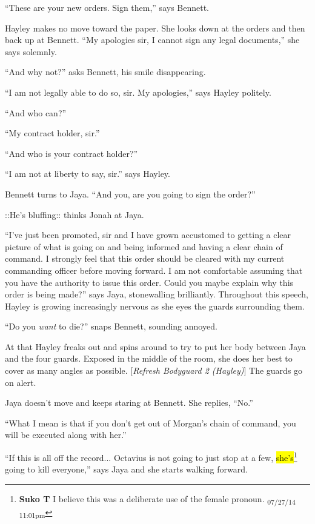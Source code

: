 ``These are your new orders.  Sign them,'' says Bennett.

Hayley makes no move toward the paper.  She looks down at the orders and then back up at Bennett.  ``My apologies sir, I cannot sign any legal documents,'' she says solemnly.

``And why not?'' asks Bennett, his smile disappearing.

``I am not legally able to do so, sir.  My apologies,'' says Hayley politely.

``And who can?''

``My contract holder, sir.''

``And who is your contract holder?''

``I am not at liberty to say, sir.'' says Hayley.

Bennett turns to Jaya.  ``And you, are you going to sign the order?''

 {\color[RGB]{74,134,232}::He's bluffing:: } thinks Jonah at Jaya.

``I've just been promoted, sir and I have grown accustomed to getting a clear picture of what is going on and being informed and having a clear chain of command.  I strongly feel that this order should be cleared with my current commanding officer before moving forward.  I am not comfortable assuming that you have the authority to issue this order.  Could you maybe explain why this order is being made?'' says Jaya, stonewalling brilliantly.  Throughout this speech, Hayley is growing increasingly nervous as she eyes the guards surrounding them.

``Do you \textit{want} to die?'' snaps Bennett, sounding annoyed.

At that Hayley freaks out and spins around to try to put her body between Jaya and the four guards.  Exposed in the middle of the room, she does her best to cover as many angles as possible. {[}\textit{Refresh Bodyguard 2 (Hayley)}{]}  The guards go on alert.

Jaya doesn't move and keeps staring at Bennett.  She replies, ``No.''

``What I mean is that if you don't get out of Morgan's chain of command, you will be executed along with her.''

``If this is all off the record... Octavius is not going to just stop at a few, \hl{she's}\footnote{\textbf{Suko T }I believe this was a deliberate use of the female pronoun. \textsubscript{07/27/14 11:01pm}} going to kill everyone,'' says Jaya and she starts walking forward.

